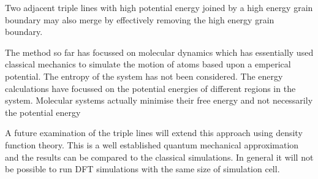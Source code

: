 \documentclass[12pt,a4paper]{book}
\begin{document}
Two adjacent triple lines with high potential energy joined by a high energy grain boundary may also merge by effectively removing the high energy grain boundary. 


The method so far has focussed on molecular dynamics which has essentially used classical mechanics to simulate the motion of atoms based upon a emperical potential. The entropy of the system has not been considered. The energy calculations have focussed on the potential energies of different regions in the system. Molecular systems actually minimise their free energy and not necessarily the potential energy 

A future examination of the triple lines will extend this approach using density function theory. This is a well established quantum mechanical approximation and the results can be compared to the classical simulations. In general it will not be possible to run DFT simulations with the same size of simulation cell.  

 
\end{document}
